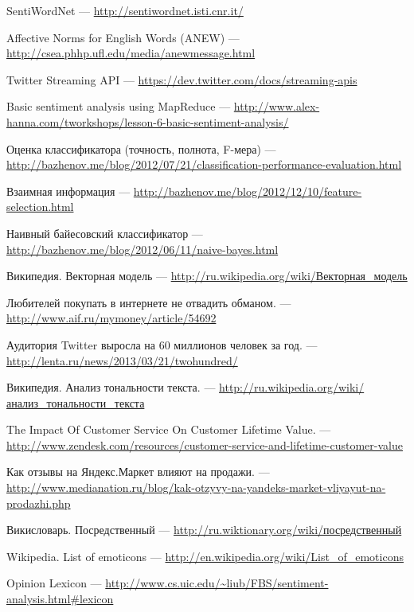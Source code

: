 SentiWordNet --- \url{http://sentiwordnet.isti.cnr.it/}

Affective Norms for English Words (ANEW) --- \url{http://csea.phhp.ufl.edu/media/anewmessage.html}

Twitter Streaming API --- \url{https://dev.twitter.com/docs/streaming-apis}

Basic sentiment analysis using MapReduce --- \url{http://www.alex-hanna.com/tworkshops/lesson-6-basic-sentiment-analysis/}

Оценка классификатора (точность, полнота, F-мера) --- \url{http://bazhenov.me/blog/2012/07/21/classification-performance-evaluation.html}

Взаимная информация --- \url{http://bazhenov.me/blog/2012/12/10/feature-selection.html}

Наивный байесовский классификатор --- \url{http://bazhenov.me/blog/2012/06/11/naive-bayes.html}

Википедия. Векторная модель --- \href{http://ru.wikipedia.org/wiki/%D0%92%D0%B5%D0%BA%D1%82%D0%BE%D1%80%D0%BD%D0%B0%D1%8F_%D0%BC%D0%BE%D0%B4%D0%B5%D0%BB%D1%8C}{http://ru.wikipedia.org/wiki/Векторная\_модель}

Любителей покупать в интернете не отвадить обманом. --- \url{http://www.aif.ru/mymoney/article/54692}

Аудитория Twitter выросла на 60 миллионов человек за год. --- \url{http://lenta.ru/news/2013/03/21/twohundred/}

Википедия. Анализ тональности текста. --- \href{http://ru.wikipedia.org/wiki/%D0%90%D0%BD%D0%B0%D0%BB%D0%B8%D0%B7_%D1%82%D0%BE%D0%BD%D0%B0%D0%BB%D1%8C%D0%BD%D0%BE%D1%81%D1%82%D0%B8_%D1%82%D0%B5%D0%BA%D1%81%D1%82%D0%B0}{http://ru.wikipedia.org/wiki/анализ\_тональности\_текста}

The Impact Of Customer Service On Customer Lifetime Value. --- \url{http://www.zendesk.com/resources/customer-service-and-lifetime-customer-value}

Как отзывы на Яндекс.Маркет влияют на продажи. --- \url{http://www.medianation.ru/blog/kak-otzyvy-na-yandeks-market-vliyayut-na-prodazhi.php}

Викисловарь. Посредственный --- \href{http://ru.wiktionary.org/wiki/%D0%BF%D0%BE%D1%81%D1%80%D0%B5%D0%B4%D1%81%D1%82%D0%B2%D0%B5%D0%BD%D0%BD%D1%8B%D0%B9}{http://ru.wiktionary.org/wiki/посредственный}

Wikipedia. List of emoticons --- \url{http://en.wikipedia.org/wiki/List_of_emoticons}

Opinion Lexicon --- \url{http://www.cs.uic.edu/~liub/FBS/sentiment-analysis.html#lexicon}
